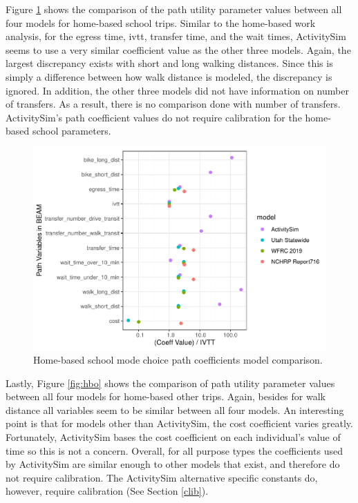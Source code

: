 \documentclass[12pt, oneside, openright]{byuthesis}
\begin{document}
Figure \ref{fig:hbs} shows the comparison of the path utility parameter values between all four models for home-based school trips. Similar to the home-based work analysis, for the egress time, ivtt, transfer time, and the wait times, ActivitySim seems to use a very similar coefficient value as the other three models. Again, the largest discrepancy exists with short and long walking distances. Since this is simply a difference between how walk distance is modeled, the discrepancy is ignored. In addition, the other three models did not have information on number of transfers. As a result, there is no comparison done with number of transfers. ActivitySim's path coefficient values do not require calibration for the home-based school parameters.

\begin{figure}

{\centering \includegraphics{thesis_files/figure-latex/hbs-1} 

}

\caption{Home-based school mode choice path coefficients model comparison.}\label{fig:hbs}
\end{figure}

Lastly, Figure \ref{fig:hbo} shows the comparison of path utility parameter values between all four models for home-based other trips. Again, besides for walk distance all variables seem to be similar between all four models. An interesting point is that for models other than ActivitySim, the cost coefficient varies greatly. Fortunately, ActivitySim bases the cost coefficient on each individual's value of time so this is not a concern. Overall, for all purpose types the coefficients used by ActivitySim are similar enough to other models that exist, and therefore do not require calibration. The ActivitySim alternative specific constants do, however, require calibration (See Section \ref{clib}).
\end{document}

